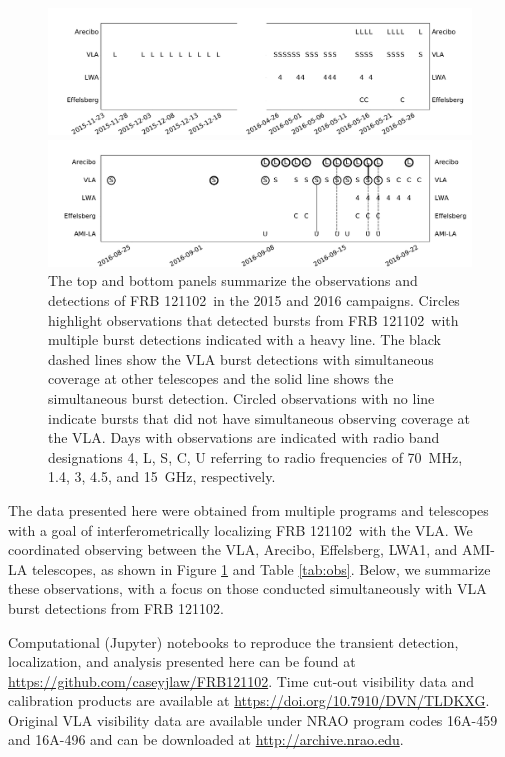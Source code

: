 \documentclass[twocolumn]{aastex61}
\newcommand{\frb}{FRB 121102}
\begin{document}
\begin{figure}[t]
\begin{center}
\includegraphics[width=2\columnwidth]{timeline0.pdf}

\includegraphics[width=2\columnwidth]{timeline.pdf}
\caption{The top and bottom panels summarize the observations and detections of \frb\ in the 2015 and 2016 campaigns. Circles highlight observations that detected bursts from \frb\ with multiple burst detections indicated with a heavy line. The black dashed lines show the VLA burst detections with simultaneous coverage at other telescopes and the solid line shows the simultaneous burst detection. Circled observations with no line indicate bursts that did not have simultaneous observing coverage at the VLA. Days with observations are indicated with radio band designations 4, L, S, C, U referring to radio frequencies of 70~MHz, 1.4, 3, 4.5, and 15~GHz, respectively.
\label{fig:sched}}
\end{center}
\end{figure}

The data presented here were obtained from multiple programs and telescopes with a goal of interferometrically localizing \frb\ with the VLA. We coordinated observing between the VLA, Arecibo, Effelsberg, LWA1, and AMI-LA telescopes, as shown in Figure \ref{fig:sched} and Table \ref{tab:obs}. Below, we summarize these observations, with a focus on those conducted simultaneously with VLA burst detections from \frb.

Computational (Jupyter) notebooks to reproduce the transient detection, localization, and analysis presented here can be found at \url{https://github.com/caseyjlaw/FRB121102}. Time cut-out visibility data and calibration products are available at \url{https://doi.org/10.7910/DVN/TLDKXG}. Original VLA visibility data are available under NRAO program codes 16A-459 and 16A-496 and can be downloaded at \url{http://archive.nrao.edu}.
\end{document}
